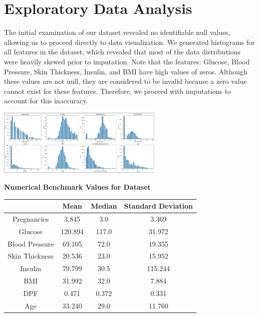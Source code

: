 \documentclass[journal]{IEEEtran}
\begin{document}
\section{Exploratory Data Analysis}
The initial examination of our dataset revealed no identifiable null values, allowing us to proceed directly to data visualization. We generated histograms for all features in the dataset, which revealed that most of the data distributions were heavily skewed prior to imputation. Note that the features: Glucose, Blood Pressure, Skin Thickness, Insulin, and BMI have high values of zeros. Although these values are not null, they are considered to be invalid because a zero value cannot exist for these features. Therefore, we proceed with imputations to account for this inaccuracy.
\begin{center}
    \includegraphics[width=8cm]{DATA-VIZ.png}
\end{center}
\begin{center}
    \textbf{Numerical Benchmark Values for Dataset}
\end{center}
\begin{tabular}{|c|c|c|c|}
     \hline
      & Mean & Median & Standard Deviation \\
     \hline
     Pregnancies & 3.845 & 3.0 & 3.369 \\
     \hline
     Glucose & 120.894 & 117.0 & 31.972 \\
     \hline
     Blood Pressure & 69.105 & 72.0 & 19.355 \\
     \hline
     Skin Thickness & 20.536 & 23.0 & 15.952 \\
     \hline
     Insulin & 79.799 & 30.5 & 115.244 \\
     \hline
     BMI & 31.992 & 32.0 & 7.884 \\
     \hline
     DPF & 0.471 & 0.372 & 0.331 \\
     \hline
     Age & 33.240 & 29.0 & 11.760 \\
     \hline
\end{tabular} \\
\end{document}
